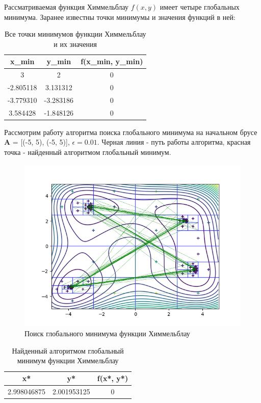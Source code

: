 Рассматриваемая функция Химмельблау $f(x, y)$ имеет четыре глобальных минимума. Заранее известны точки минимумы и значения функций в ней:

\begin{table}[H]
	\centering
	\begin{tabular}{| c | c | c |}
		\hline
		    x_{min} & y_{min} & f(x_{min}, y_{min}) \\
		\hline
		    3 & 2 & 0 \\
		    -2.805118 & 3.131312 & 0 \\
		    -3.779310 & -3.283186 & 0 \\
		    3.584428 & -1.848126 & 0 \\
   		\hline
	\end{tabular}
	\caption{Все точки минимумов функции Химмельблау и их значения}
\end{table}

Рассмотрим работу алгоритма поиска глобального минимума на начальном брусе \textbf{A} = [(-5, 5), (-5, 5)], $\epsilon = 0.01$. Черная линия - путь работы алгоритма, красная точка - найденный алгоритмом глобальный минимум.

\begin{figure}[H]
	\centering
		\includegraphics{task2/resources/Figure_4.png}
	\caption{Поиск глобального минимума функции Химмельблау}
	\label{w_pert}
\end{figure}

\begin{table}[H]
	\centering
	\begin{tabular}{| c | c | c |}
		\hline
		    x* & y* & f(x*, y*) \\
		\hline
		    2.998046875 & 2.001953125 & 0 \\
   		\hline
	\end{tabular}
	\caption{Найденный алгоритмом глобальный минимум функции Химмельблау}
\end{table}
